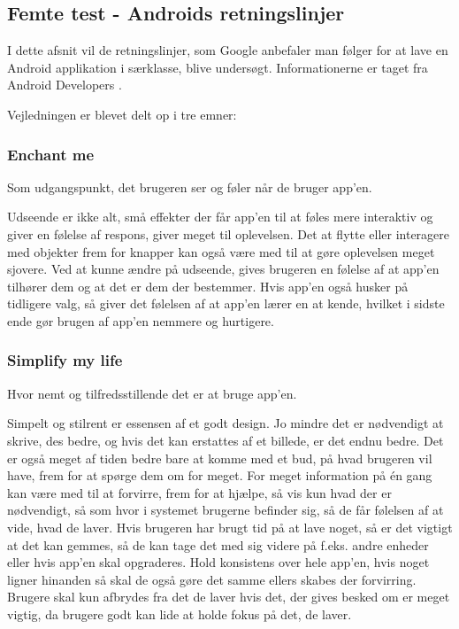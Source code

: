 \subsection{Femte test - Androids retningslinjer}
\label{sec:femtetest}
I dette afsnit vil de retningslinjer, som Google anbefaler man følger for at lave en Android applikation i særklasse, blive undersøgt.
Informationerne er taget fra Android Developers \citep{AndRet}.

Vejledningen er blevet delt op i tre emner:
\subsubsection*{Enchant me}
Som udgangspunkt, det brugeren ser og føler når de bruger app'en.

Udseende er ikke alt, små effekter der får app'en til at føles mere interaktiv og giver en følelse af respons, giver meget til oplevelsen. Det at flytte eller interagere med objekter frem for knapper kan også være med til at gøre oplevelsen meget sjovere. Ved at kunne ændre på udseende, gives brugeren en følelse af at app'en tilhører dem og at det er dem der bestemmer. Hvis app'en også husker på tidligere valg, så giver det følelsen af at app'en lærer en at kende, hvilket i sidste ende gør brugen af app'en nemmere og hurtigere.

\subsubsection*{Simplify my life}
Hvor nemt og tilfredsstillende det er at bruge app'en.

Simpelt og stilrent er essensen af et godt design. Jo mindre det er nødvendigt at skrive, des bedre, og hvis det kan erstattes af et billede, er det endnu bedre. Det er også meget af tiden bedre bare at komme med et bud, på hvad brugeren vil have, frem for at spørge dem om for meget. For meget information på én gang kan være med til at forvirre, frem for at hjælpe, så vis kun hvad der er nødvendigt, så som hvor i systemet brugerne befinder sig, så de får følelsen af at vide, hvad de laver. Hvis brugeren har brugt tid på at lave noget, så er det vigtigt at det kan gemmes, så de kan tage det med sig videre på f.eks. andre enheder eller hvis app'en skal opgraderes. Hold konsistens over hele app'en, hvis noget ligner hinanden så skal de også gøre det samme ellers skabes der forvirring. Brugere skal kun afbrydes fra det de laver hvis det, der gives besked om er meget vigtig, da brugere godt kan lide at holde fokus på det, de laver.
